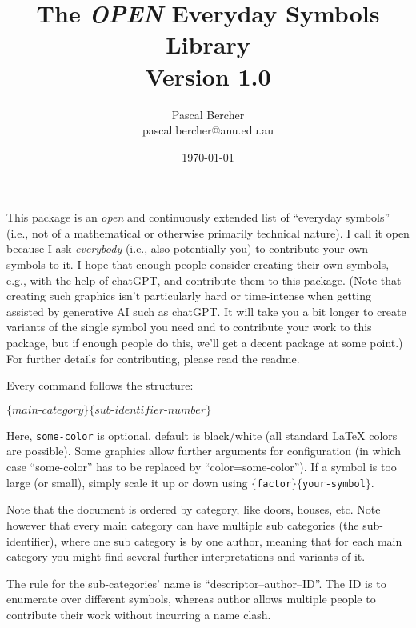 \documentclass{article}
\begin{document}
\title{The \emph{OPEN} Everyday Symbols Library\\[1ex]\large Version 1.0}
\author{Pascal Bercher\\pascal.bercher@anu.edu.au}
\date{\today}

\maketitle

\setlength{\parindent}{0pt}

This package is an \emph{open} and continuously extended list of ``everyday symbols'' (i.e., not of a mathematical or otherwise primarily technical nature). I call it open because I ask \emph{everybody} (i.e., also potentially you) to contribute your own symbols to it. I hope that enough people consider creating their own symbols, e.g., with the help of chatGPT, and contribute them to this package. (Note that creating such graphics isn't particularly hard or time-intense when getting assisted by generative AI such as chatGPT. It will take you a bit longer to create variants of the single symbol you need and to contribute your work to this package, but if enough people do this, we'll get a decent package at some point.) For further details for contributing, please read the readme.

\medskip
Every command follows the structure:
\begin{center}
  \texttt{\string{}$\{\textit{main-category}\}\{\textit{sub-identifier-number}\}$}
\end{center}
Here, \texttt{some-color} is optional, default is black/white (all standard \LaTeX{} colors are possible). Some graphics allow further arguments for configuration (in which case ``some-color'' has to be replaced by ``color=some-color''). If a symbol is too large (or small), simply scale it up or down using
\texttt{\string\scalebox$\{$factor$\}\{$your-symbol$\}$}.

\medskip
Note that the document is ordered by category, like doors, houses, etc. Note however that every main category can have multiple sub categories (the sub-identifier), where one sub category is by one author, meaning that for each main category you might find several further interpretations and variants of it. 

\medskip
The rule for the sub-categories' name is ``descriptor--author--ID''. The ID is to enumerate over different symbols, whereas author allows multiple people to contribute their work without incurring a name clash.
\end{document}
